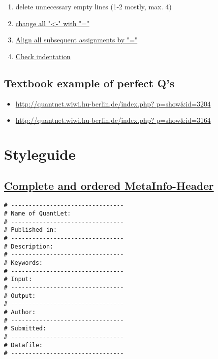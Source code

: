 \documentclass{article}
\begin{document}
\begin{enumerate}
\begin {enumerate}
\begin{enumerate}
				\item check that the code still works 							properly	
			\end{enumerate}
		\item delete unnecessary empty lines (1-2 						mostly, max. 4)
		\item \label{all-equal-ini}\hyperref[all-equal]{change all "\textless -" with "="}
		\item \label{align-assign-ini}\hyperref[align-assign]{Align all subsequent assignments by "="}
		\item \label{indentation-ini}\hyperref[indentation]{Check indentation}
	\end{enumerate}
\end{enumerate}

\subsection*{Textbook example of perfect Q's}
\begin{itemize}
	\item \url{http://quantnet.wiwi.hu-berlin.de/index.php?			p=show&id=3204}
	\item \url{http://quantnet.wiwi.hu-berlin.de/index.php?			p=show&id=3164}
\end{itemize}

\section*{Styleguide}

\subsection{\label{MetaInfo}\hyperref[MetaInfo-ini]{Complete and ordered MetaInfo-Header}}
\begin{lstlisting}[frame=single]
# --------------------------------
# Name of QuantLet:
# --------------------------------
# Published in:
# --------------------------------
# Description:
# --------------------------------
# Keywords:
# --------------------------------
# Input:
# --------------------------------
# Output:
# --------------------------------
# Author:
# --------------------------------
# Submitted:
# --------------------------------
# Datafile:
# --------------------------------
\end{lstlisting}
\end{document}
